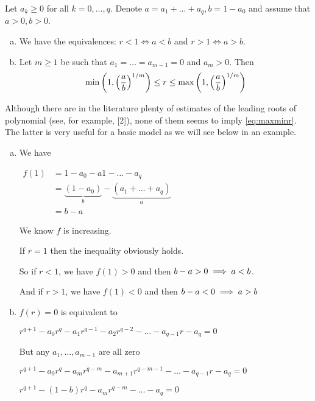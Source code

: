 \begin{theorem}\label{thm:rineq}
Let $a_k \geq 0$ for all $k = 0, \dots , q$. Denote $a = a_1 + \dots + a_q, b = 1 - a_0$
and assume that $a > 0, b > 0$.
\begin{enumerate}[(a)]
    \item We have the equivalences: $r < 1 \iff a < b$ and $r > 1 \iff a > b$.
    \item Let $m \geq 1$ be such that $a_1 = \dots = a_{m-1} = 0$ and $a_m > 0$. Then
    \begin{equation} \label{eq:maxminr}
        \min\left(1,\left(\frac{a}{b}\right)^{1/m}\right)\leq r \leq \max\left(1,\left(\frac{a}{b}\right)^{1/m}\right)
    \end{equation}
\end{enumerate}
\begin{remark}
Although there are in the literature plenty of estimates of the leading roots of polynomial (see, for example, [2]), none of them seems to imply \ref{eq:maxminr}. The latter is very useful for a basic model as we will see below in an example.
\end{remark}
\begin{pf}
\begin{enumerate}[(a)]
    \item We have 
    
    $\begin{aligned}
    f(1) &= 1 - a_0 - a1 - \dots - a_q \\
           &= \underbrace{(1-a_0)}_{b}-\underbrace{(a_1+\dots+a_q)}_{a}\\
           &= b - a
    \end{aligned}$
    
    We know $f$ is increasing.
    
     If $r=1$ then the inequality obviously holds.
    
    So if $r<1$, we have $f(1)>0$ and then $b - a>0 \implies a<b$.
    
    And if $r>1$, we have $f(1)<0$ and then $b - a<0 \implies a>b$
    
    \item $f(r)=0$ is equivalent to 
    
    $r^{q+1} - a_0r^q - a_1r^{q-1} - a_2r^{q-2} - \dots - a_{q-1}r - a_q=0$
    
    But any $a_1,\dots,a_{m-1}$ are all zero
    
    \imp $r^{q+1} - a_0r^q - a_mr^{q-m} - a_{m+1}r^{q-m-1} - \dots - a_{q-1}r - a_q=0$ 
     
    \imp $r^{q+1} - (1-b)r^q - a_mr^{q-m} - \dots -  a_q=0$
    

\end{enumerate}
\end{pf}
\end{theorem}
